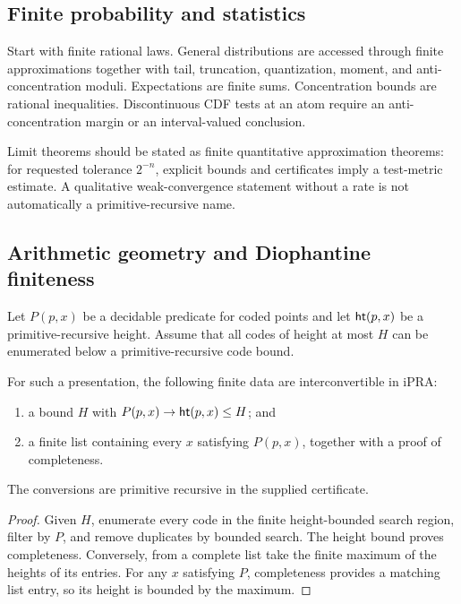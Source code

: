 \subsection{Finite probability and statistics}

Start with finite rational laws.  General distributions are accessed through
finite approximations together with tail, truncation, quantization, moment, and
anti-concentration moduli.  Expectations are finite sums.  Concentration bounds
are rational inequalities.  Discontinuous CDF tests at an atom require an
anti-concentration margin or an interval-valued conclusion.

Limit theorems should be stated as finite quantitative approximation theorems:
for requested tolerance \(2^{-n}\), explicit bounds and certificates imply a
test-metric estimate.  A qualitative weak-convergence statement without a rate
is not automatically a primitive-recursive name.

\subsection{Arithmetic geometry and Diophantine finiteness}

Let \(P(p,x)\) be a decidable predicate for coded points and let
\(\mathsf{ht}(p,x)\) be a primitive-recursive height.  Assume that all codes of
height at most \(H\) can be enumerated below a primitive-recursive code bound.

\begin{theorem}
\label{thm:height-list}
For such a presentation, the following finite data are interconvertible in
iPRA:
\begin{enumerate}[label=(\alph*)]
\item a bound \(H\) with \(P(p,x)\to\mathsf{ht}(p,x)\le H\); and
\item a finite list containing every \(x\) satisfying \(P(p,x)\), together
      with a proof of completeness.
\end{enumerate}
The conversions are primitive recursive in the supplied certificate.
\end{theorem}

\begin{proof}
Given \(H\), enumerate every code in the finite height-bounded search region,
filter by \(P\), and remove duplicates by bounded search.  The height bound
proves completeness.  Conversely, from a complete list take the finite maximum
of the heights of its entries.  For any \(x\) satisfying \(P\), completeness
provides a matching list entry, so its height is bounded by the maximum.
\end{proof}

